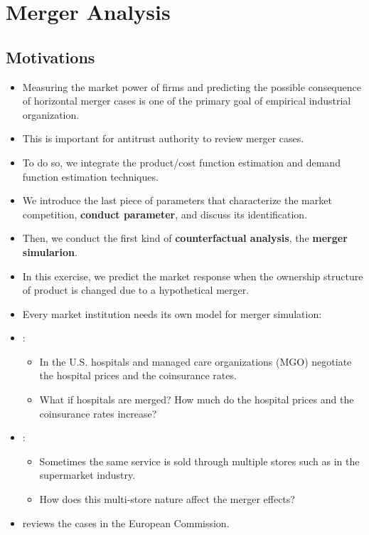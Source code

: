 \documentclass[]{book}
\providecommand{\tightlist}{%
  \setlength{\itemsep}{0pt}\setlength{\parskip}{0pt}}
\begin{document}
\chapter{Merger Analysis}\label{merger}

\section{Motivations}\label{motivations-2}

\begin{itemize}
\tightlist
\item
  Measuring the market power of firms and predicting the possible
  consequence of horizontal merger cases is one of the primary goal of
  empirical industrial organization.
\item
  This is important for antitrust authority to review merger cases.
\item
  To do so, we integrate the product/cost function estimation and demand
  function estimation techniques.
\item
  We introduce the last piece of parameters that characterize the market
  competition, \textbf{conduct parameter}, and discuss its
  identification.
\item
  Then, we conduct the first kind of \textbf{counterfactual analysis},
  the \textbf{merger simularion}.
\item
  In this exercise, we predict the market response when the ownership
  structure of product is changed due to a hypothetical merger.
\item
  Every market institution needs its own model for merger simulation:
\item
  \citet{Gowrisankaran2015}:

  \begin{itemize}
  \tightlist
  \item
    In the U.S. hospitals and managed care organizations (MGO) negotiate
    the hospital prices and the coinsurance rates.
  \item
    What if hospitals are merged? How much do the hospital prices and
    the coinsurance rates increase?
  \end{itemize}
\item
  \citet{Smith2004}:

  \begin{itemize}
  \tightlist
  \item
    Sometimes the same service is sold through multiple stores such as
    in the supermarket industry.
  \item
    How does this multi-store nature affect the merger effects?
  \end{itemize}
\item
  \citet{Ivaldi2005} reviews the cases in the European Commission.
\end{itemize}
\end{document}
